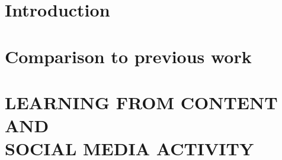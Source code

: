 \begin{abstract}
%
\end{abstract}

\vspace{-0.5cm}


\section{Introduction}
\label{sec:introduction}


\section{Comparison to previous work}
\label{sec:comparison_to_previous_work}


\vspace{-0.2cm}
\section{LEARNING FROM CONTENT AND \\SOCIAL MEDIA ACTIVITY}
\label{sec:content_and_networks}


